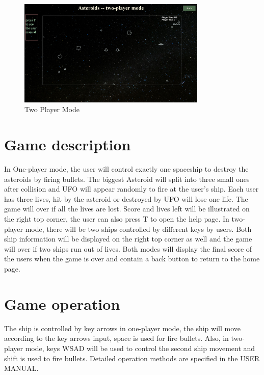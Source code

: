 \documentclass[12pt, titlepage]{article}
\begin{document}
\begin{figure}[!h]
\begin{center}
\includegraphics[width=0.8\textwidth]{Two_Player_Mode.jpg}
\end{center}
\caption{Two Player Mode}
\label{fig:two_Players}
\end{figure}

\section* {Game description}
In One-player mode, the user will control exactly one spaceship to destroy the asteroids by firing bullets. The biggest Asteroid will split into three small ones after collision and UFO will appear randomly to fire at the user's ship. Each user has three lives, hit by the asteroid or destroyed by UFO will lose one life. The game will over if all the lives are lost. Score and lives left will be illustrated on the right top corner, the user can also press T to open the help page. In two-player mode, there will be two ships controlled by different keys by users. Both ship information will be displayed on the right top corner as well and the game will over if two ships run out of lives. Both modes will display the final score of the users when the game is over and contain a back button to return to the home page.
\section* {Game operation}
The ship is controlled by key arrows in one-player mode, the ship will move according to the key arrows input, space is used for fire bullets. Also, in two-player mode, keys WSAD will be used to control the second ship movement and shift is used to fire bullets. Detailed operation methods are specified in the USER MANUAL.
\end{document}
